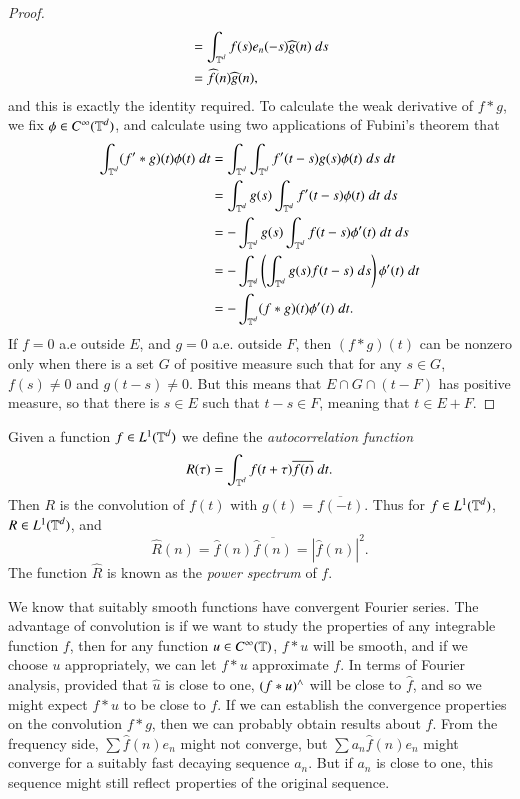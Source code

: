 \begin{proof}
\begin{align*}
        &= \int_{\operatorname{\mathbb{T}}^d} f(s) e_n(-s) \widehat{g}(n)\ ds\\
        &= \widehat{f}(n) \widehat{g}(n),
    \end{align*}
    and this is exactly the identity required. To calculate the weak derivative of $f * g$, we fix $\phi \in C^\infty(\operatorname{\mathbb{T}}^d)$, and calculate using two applications of Fubini's theorem that
    \begin{align*}
        \int_{\operatorname{\mathbb{T}}^d} (f' * g)(t) \phi(t)\; dt &= \int_{\operatorname{\mathbb{T}}^d} \int_{\operatorname{\mathbb{T}}^d} f'(t-s) g(s) \phi(t)\; ds\; dt\\
        &= \int_{\operatorname{\mathbb{T}}^d} g(s) \int_{\operatorname{\mathbb{T}}^d} f'(t-s) \phi(t)\; dt\; ds\\
        &= - \int_{\operatorname{\mathbb{T}}^d} g(s) \int_{\operatorname{\mathbb{T}}^d} f(t-s) \phi'(t)\; dt\; ds\\
        &= - \int_{\operatorname{\mathbb{T}}^d} \left( \int_{\operatorname{\mathbb{T}}^d} g(s) f(t-s)\; ds \right) \phi'(t)\; dt\\
        &= - \int_{\operatorname{\mathbb{T}}^d} (f * g)(t) \phi'(t)\; dt.
    \end{align*}
    If $f = 0$ a.e outside $E$, and $g = 0$ a.e. outside $F$, then $(f * g)(t)$ can be nonzero only when there is a set $G$ of positive measure such that for any $s \in G$, $f(s) \neq 0$ and $g(t-s) \neq 0$. But this means that $E \cap G \cap (t-F)$ has positive measure, so that there is $s \in E$ such that $t-s \in F$, meaning that $t \in E + F$.
\end{proof}

\begin{example}
    Given a function $f \in L^1(\operatorname{\mathbb{T}}^d)$ we define the \emph{autocorrelation function}
    \[ R(\tau) = \int_{\operatorname{\mathbb{T}}^d} f(t + \tau) \overline{f(t)}\; dt. \]
    Then $R$ is the convolution of $f(t)$ with $g(t) = \overline{f(-t)}$. Thus for $f \in L^1(\operatorname{\mathbb{T}}^d)$, $R \in L^1(\operatorname{\mathbb{T}}^d)$, and
    \[ \widehat{R}(n) = \widehat{f}(n) \overline{\widehat{f}(n)} = |\widehat{f}(n)|^2. \]
    The function $\widehat{R}$ is known as the \emph{power spectrum} of $f$.
\end{example}

We know that suitably smooth functions have convergent Fourier series. The advantage of convolution is if we want to study the properties of any integrable function $f$, then for any function $u \in C^\infty(\operatorname{\mathbb{T}})$, $f * u$ will be smooth, and if we choose $u$ appropriately, we can let $f * u$ approximate $f$. In terms of Fourier analysis, provided that $\widehat{u}$ is close to one, $(f*u)^\wedge$ will be close to $\widehat{f}$, and so we might expect $f * u$ to be close to $f$. If we can establish the convergence properties on the convolution $f * g$, then we can probably obtain results about $f$. From the frequency side, $\sum \widehat{f}(n) e_n$ might not converge, but $\sum a_n \widehat{f}(n) e_n$ might converge for a suitably fast decaying sequence $a_n$. But if $a_n$ is close to one, this sequence might still reflect properties of the original sequence.

